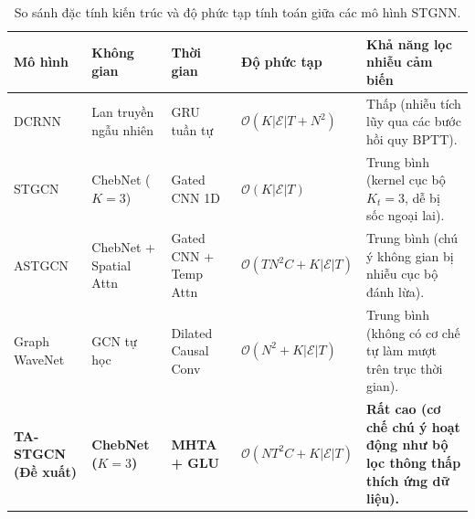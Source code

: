 \begin{table}[htbp]
\centering
\caption{So sánh đặc tính kiến trúc và độ phức tạp tính toán giữa các mô hình STGNN.}
\label{tab:so_sanh_kien_truc_stgcn}
\footnotesize
\setlength{\tabcolsep}{4pt}
\renewcommand{\arraystretch}{1.2}
\begin{tabularx}{\textwidth}{l >{\raggedright\arraybackslash}p{2.3cm} >{\raggedright\arraybackslash}p{2.2cm} >{\raggedright\arraybackslash}p{2.8cm} >{\raggedright\arraybackslash}X}
\toprule
\textbf{Mô hình} & \textbf{Không gian} & \textbf{Thời gian} & \textbf{Độ phức tạp} & \textbf{Khả năng lọc nhiễu cảm biến} \\
\midrule
DCRNN \cite{dcrnn} & Lan truyền ngẫu nhiên & GRU tuần tự & $\mathcal{O}(K |\mathcal{E}| T + N^2)$ & Thấp (nhiễu tích lũy qua các bước hồi quy BPTT). \\
STGCN \cite{stgcn} & ChebNet ($K=3$) & Gated CNN 1D & $\mathcal{O}(K |\mathcal{E}| T)$ & Trung bình (kernel cục bộ $K_t=3$, dễ bị sốc ngoại lai). \\
ASTGCN \cite{astgcn} & ChebNet + Spatial Attn & Gated CNN + Temp Attn & $\mathcal{O}(T N^2 C + K |\mathcal{E}| T)$ & Trung bình (chú ý không gian bị nhiễu cục bộ đánh lừa). \\
Graph WaveNet \cite{wavenet} & GCN tự học & Dilated Causal Conv & $\mathcal{O}(N^2 + K |\mathcal{E}| T)$ & Trung bình (không có cơ chế tự làm mượt trên trục thời gian). \\
\textbf{TA-STGCN (Đề xuất)} & \textbf{ChebNet ($K=3$)} & \textbf{MHTA + GLU} & $\mathcal{O}(N T^2 C + K |\mathcal{E}| T)$ & \textbf{Rất cao (cơ chế chú ý hoạt động như bộ lọc thông thấp thích ứng dữ liệu).} \\
\bottomrule
\end{tabularx}
\end{table}

